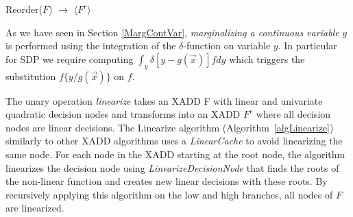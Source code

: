 \documentclass[twoside,11pt]{article}
\begin{document}
\incmargin{0.5em}
\linesnumbered
\begin{algorithm}[t!]
\dontprintsemicolon

\BlankLine
{}
\caption{{\sc Reorder}($F$) $\longrightarrow$ $\langle F^r \rangle$ \label{alg:reorder}}
\end{algorithm}
\decmargin{0.5em}

As we have seen in Section \ref{MargContVar}, \emph{marginalizing a continuous variable} $y$ is performed using the integration of the $\delta$-function on variable $y$. In particular for SDP we require computing $\int_{y} \delta [ y - g(\vec{x})]fdy$ which triggers the substitution $f \lbrace y/ g(\vec{x})\rbrace$ on $f$.


The unary operation \emph{linearize} takes an XADD F with linear and univariate quadratic decision nodes and transforms into an XADD $F^r$ where all decision nodes are linear decisions.
The Linearize algorithm (Algorithm~\ref{algLinearize}) similarly to other XADD algorithms uses a \emph{LinearCache} to avoid linearizing the same node. For each node in the XADD starting at the root node, the algorithm linearizes the decision node using \emph{LinearizeDecisionNode} that finds the roots of the non-linear function and creates new linear decisions with these roots. By recursively applying this algorithm on the low and high branches, all nodes of $F$ are linearized.
\end{document}
